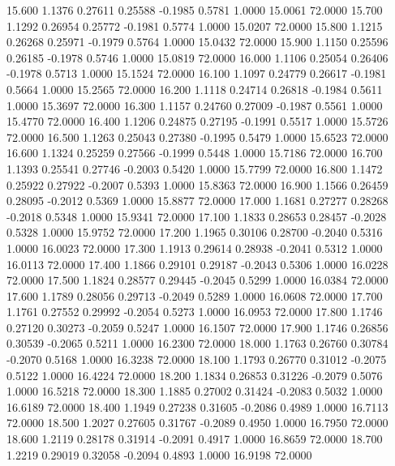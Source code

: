   15.600   1.1376   0.27611   0.25588  -0.1985   0.5781   1.0000  15.0061  72.0000
  15.700   1.1292   0.26954   0.25772  -0.1981   0.5774   1.0000  15.0207  72.0000
  15.800   1.1215   0.26268   0.25971  -0.1979   0.5764   1.0000  15.0432  72.0000
  15.900   1.1150   0.25596   0.26185  -0.1978   0.5746   1.0000  15.0819  72.0000
  16.000   1.1106   0.25054   0.26406  -0.1978   0.5713   1.0000  15.1524  72.0000
  16.100   1.1097   0.24779   0.26617  -0.1981   0.5664   1.0000  15.2565  72.0000
  16.200   1.1118   0.24714   0.26818  -0.1984   0.5611   1.0000  15.3697  72.0000
  16.300   1.1157   0.24760   0.27009  -0.1987   0.5561   1.0000  15.4770  72.0000
  16.400   1.1206   0.24875   0.27195  -0.1991   0.5517   1.0000  15.5726  72.0000
  16.500   1.1263   0.25043   0.27380  -0.1995   0.5479   1.0000  15.6523  72.0000
  16.600   1.1324   0.25259   0.27566  -0.1999   0.5448   1.0000  15.7186  72.0000
  16.700   1.1393   0.25541   0.27746  -0.2003   0.5420   1.0000  15.7799  72.0000
  16.800   1.1472   0.25922   0.27922  -0.2007   0.5393   1.0000  15.8363  72.0000
  16.900   1.1566   0.26459   0.28095  -0.2012   0.5369   1.0000  15.8877  72.0000
  17.000   1.1681   0.27277   0.28268  -0.2018   0.5348   1.0000  15.9341  72.0000
  17.100   1.1833   0.28653   0.28457  -0.2028   0.5328   1.0000  15.9752  72.0000
  17.200   1.1965   0.30106   0.28700  -0.2040   0.5316   1.0000  16.0023  72.0000
  17.300   1.1913   0.29614   0.28938  -0.2041   0.5312   1.0000  16.0113  72.0000
  17.400   1.1866   0.29101   0.29187  -0.2043   0.5306   1.0000  16.0228  72.0000
  17.500   1.1824   0.28577   0.29445  -0.2045   0.5299   1.0000  16.0384  72.0000
  17.600   1.1789   0.28056   0.29713  -0.2049   0.5289   1.0000  16.0608  72.0000
  17.700   1.1761   0.27552   0.29992  -0.2054   0.5273   1.0000  16.0953  72.0000
  17.800   1.1746   0.27120   0.30273  -0.2059   0.5247   1.0000  16.1507  72.0000
  17.900   1.1746   0.26856   0.30539  -0.2065   0.5211   1.0000  16.2300  72.0000
  18.000   1.1763   0.26760   0.30784  -0.2070   0.5168   1.0000  16.3238  72.0000
  18.100   1.1793   0.26770   0.31012  -0.2075   0.5122   1.0000  16.4224  72.0000
  18.200   1.1834   0.26853   0.31226  -0.2079   0.5076   1.0000  16.5218  72.0000
  18.300   1.1885   0.27002   0.31424  -0.2083   0.5032   1.0000  16.6189  72.0000
  18.400   1.1949   0.27238   0.31605  -0.2086   0.4989   1.0000  16.7113  72.0000
  18.500   1.2027   0.27605   0.31767  -0.2089   0.4950   1.0000  16.7950  72.0000
  18.600   1.2119   0.28178   0.31914  -0.2091   0.4917   1.0000  16.8659  72.0000
  18.700   1.2219   0.29019   0.32058  -0.2094   0.4893   1.0000  16.9198  72.0000
